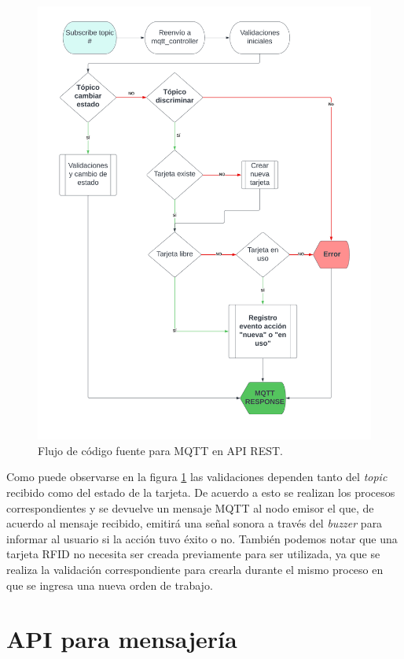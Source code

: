 \begin{figure}[H]
	\centering
	\includegraphics[width=\textwidth]{./Figures/mqtt-controller-api-2.png}
	\caption{Flujo de código fuente para MQTT en API REST.}
	\label{fig:mqttcontrollerapi}
\end{figure}

Como puede observarse en la figura \ref{fig:mqttcontrollerapi} las validaciones dependen tanto del \textit{topic} recibido como del estado de la tarjeta. De acuerdo a esto se realizan los procesos correspondientes y se devuelve un mensaje MQTT al nodo emisor el que, de acuerdo al mensaje recibido, emitirá una señal sonora a través del \textit{buzzer} para informar al usuario si la acción tuvo éxito o no. También podemos notar que una tarjeta RFID no necesita ser creada previamente para ser utilizada, ya que se realiza la validación correspondiente para crearla durante el mismo proceso en que se ingresa una nueva orden de trabajo.


\section{API para mensajería}
\label{sec:apimessenger}

